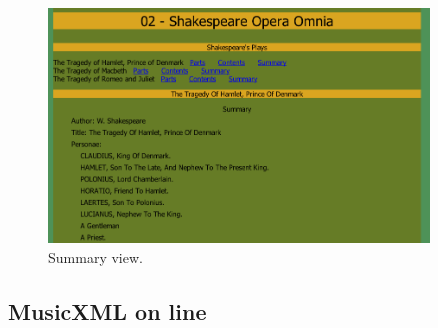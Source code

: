 \documentclass[a4paper, notitlepage]{article}
\begin{document}
\begin{figure}[ht]
\begin{center}
\includegraphics[width=0.9\textwidth]{02-5.png}
\caption{Summary view.}
\label{fig:01-3}
\end{center}
\end{figure}


\subsection{MusicXML on line}
\end{document}
